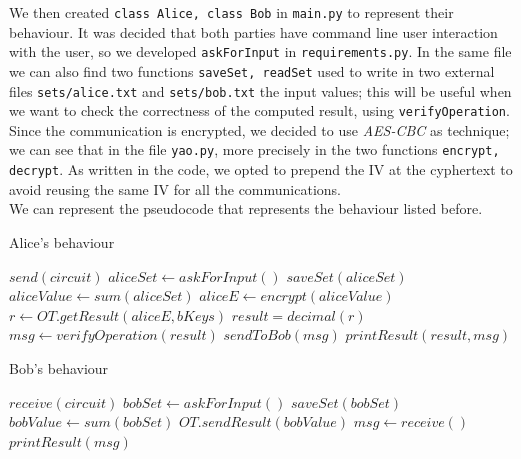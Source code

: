 \documentclass[12pt]{article}
\newcommand{\inlinecode}{\texttt}
\begin{document}
We then created \inlinecode{class Alice, class Bob} in \inlinecode{main.py} to represent their behaviour.
It was decided that both parties have command line user interaction with the user, so we developed \inlinecode{askForInput} in \inlinecode{requirements.py}. In the same file we can also find two functions \inlinecode{saveSet, readSet} used to write in two external files \inlinecode{sets/alice.txt} and \inlinecode{sets/bob.txt} the input values; this will be useful when we want to check the correctness of the computed result, using \inlinecode{verifyOperation}.\\
Since the communication is encrypted, we decided to use \textit{AES-CBC} as technique; we can see that in the file \inlinecode{yao.py}, more precisely in the two functions \inlinecode{encrypt, decrypt}. As written in the code, we opted to prepend the IV at the cyphertext to avoid reusing the same IV for all the communications.\\
We can represent the pseudocode that represents the behaviour listed before.\\

\begin{minipage}{0.46\textwidth}
    \begin{algorithm}[H]
        \centering
        \caption{Alice's behaviour}\label{alice:algo}
        \begin{algorithmic}[1]
            \State $send(circuit)$  
            \State $aliceSet \gets askForInput()$ 
            \State $saveSet(aliceSet)$ 
            \State
            \State $aliceValue \gets sum(aliceSet)$
            \State $aliceE \gets encrypt(aliceValue)$
            \State
            \State $r \gets OT.getResult(aliceE,bKeys)$
            \State
            \State $result = decimal(r)$
            \State $msg \gets verifyOperation(result)$ 
            \State $sendToBob(msg)$
            \State $printResult(result,msg)$

        \end{algorithmic}
    \end{algorithm}
    \end{minipage}
    \hfill
    \begin{minipage}{0.46\textwidth}
    \begin{algorithm}[H]
        \centering
        \caption{Bob's behaviour}\label{bob:algo}
        \begin{algorithmic}[1]
            \State $receive(circuit)$  
            \State $bobSet \gets askForInput()$ 
            \State $saveSet(bobSet)$ 
            \State
            \State $bobValue \gets sum(bobSet)$
            \State
            \State $OT.sendResult(bobValue)$
            \State
            \State $msg \gets receive()$
            \State $printResult(msg)$

        \end{algorithmic}
    \end{algorithm}
    \end{minipage}
\end{document}
